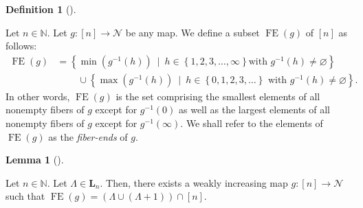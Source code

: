 \documentclass[numbers=enddot,12pt,final,onecolumn,notitlepage]{scrartcl}%
\theoremstyle{definition}
\newtheorem{lem}[theo]{Lemma}
\newenvironment{lemma}[1][]
{\begin{lem}[#1]\begin{leftbar}}
{\end{leftbar}\end{lem}}
\newtheorem{defi}[theo]{Definition}
\newenvironment{definition}[1][]
{\begin{defi}[#1]\begin{leftbar}}
{\end{leftbar}\end{defi}}
\begin{document}
\begin{definition}
\label{def.fiberends}Let $n\in\mathbb{N}$. Let $g:\left[  n\right]
\rightarrow\mathcal{N}$ be any map. We define a subset $\operatorname*{FE}%
\left(  g\right)  $ of $\left[  n\right]  $ as follows:%
\begin{align*}
\operatorname*{FE}\left(  g\right)   &  =\left\{  \min\left(  g^{-1}\left(
h\right)  \right)  \ \mid\ h\in\left\{  1,2,3,\ldots,\infty\right\}  \text{
with }g^{-1}\left(  h\right)  \neq\varnothing\right\} \\
&  \ \ \ \ \ \ \ \ \ \ \cup\left\{  \max\left(  g^{-1}\left(  h\right)
\right)  \ \mid\ h\in\left\{  0,1,2,3,\ldots\right\}  \text{ with }%
g^{-1}\left(  h\right)  \neq\varnothing\right\}  .
\end{align*}
In other words, $\operatorname*{FE}\left(  g\right)  $ is the set comprising
the smallest elements of all nonempty fibers of $g$ except for $g^{-1}\left(
0\right)  $ as well as the largest elements of all nonempty fibers of $g$
except for $g^{-1}\left(  \infty\right)  $. We shall refer to the elements of
$\operatorname*{FE}\left(  g\right)  $ as the \textit{fiber-ends} of $g$.
\end{definition}

\begin{lemma}
\label{lem.FE.exist}Let $n\in\mathbb{N}$. Let $\Lambda\in\mathbf{L}_{n}$.
Then, there exists a weakly increasing map $g:\left[  n\right]  \rightarrow
\mathcal{N}$ such that $\operatorname*{FE}\left(  g\right)  =\left(
\Lambda\cup\left(  \Lambda+1\right)  \right)  \cap\left[  n\right]  $.
\end{lemma}
\end{document}
